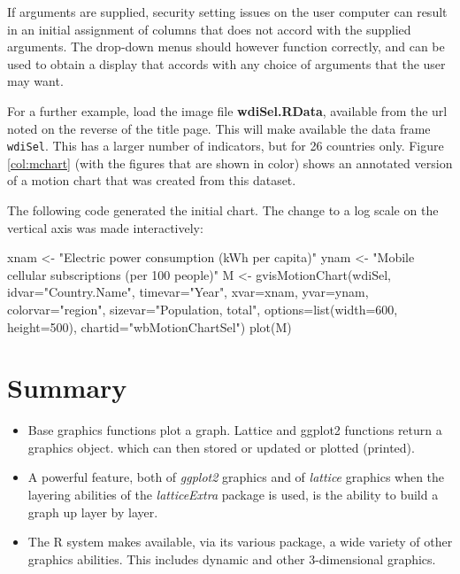 \documentclass{tufte-book}\usepackage[]{graphicx}\usepackage[]{color}
\newcommand{\txtt}[1]{\texttt{#1}}
\begin{document}
If arguments are supplied, security setting issues on the user
computer can result in an initial assignment of columns that does not
accord with the supplied arguments.  The drop-down menus should however function
correctly, and can be used to obtain a display that accords with any
choice of arguments that the user may want.

For a further example, load the image file {\bf wdiSel.RData},
available from the url noted on the reverse of the title page. This
will make available the data frame \txtt{wdiSel}. This has a larger
number of indicators, but for 26 countries only.  Figure
\ref{col:mchart} (with the figures that are shown in color) shows an
annotated version of a motion chart that was created from this
dataset.

The following code generated the initial chart.  The change
to a log scale on the vertical axis was made interactively:
\begin{fullwidth}
\begin{Schunk}
\begin{Sinput}
xnam <- "Electric power consumption (kWh per capita)"
ynam <- "Mobile cellular subscriptions (per 100 people)"
M <- gvisMotionChart(wdiSel, idvar="Country.Name", timevar="Year",
                     xvar=xnam, yvar=ynam,
                     colorvar="region", sizevar="Population, total",
                     options=list(width=600, height=500),
                     chartid="wbMotionChartSel")
plot(M)
\end{Sinput}
\end{Schunk}
\end{fullwidth}


\section{Summary}
\begin{itemize}
\item[] Base graphics functions plot a graph.  Lattice and ggplot2
functions return a graphics object. which can then stored or updated
or plotted (printed).

\item[] A powerful feature, both of \textit{ggplot2} graphics and of
  \textit{lattice} graphics when the layering abilities of the
  \textit{latticeExtra} package is used, is the ability to build a
  graph up layer by layer.

\item[] The R system makes available, via its various package,
a wide variety of other graphics abilities.  This includes
dynamic and other 3-dimensional graphics.
\end{itemize}
\end{document}
